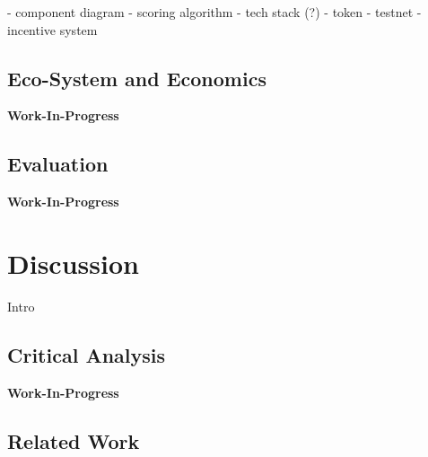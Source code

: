 \documentclass{llncs}
\begin{document}
{			- component diagram
			- scoring algorithm
			- tech stack (?)
			- token
			- testnet
			- incentive system



		\subsection{Eco-System and Economics}
		
			\textbf{Work-In-Progress}		
			
					
		
		\subsection{Evaluation}
			\label{ss:evaluation}				

			\textbf{Work-In-Progress}
			
					


	\section{Discussion}
		\label{s:section-7}	
		
		Intro

		
		\subsection{Critical Analysis}
			\label{ss:critical-analysis}
							
			\textbf{Work-In-Progress}		
		
		
		\subsection{Related Work}
			\label{ss:competitor-analysis}
			
}
\end{document}
